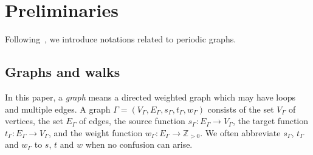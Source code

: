 \documentclass[11pt]{article}
\theoremstyle{definition}
\numberwithin{equation}{section}
\begin{document}
\section{Preliminaries}\label{section:pre}

Following~\cite{IN}, we introduce notations related to periodic graphs.

\subsection{Graphs and walks}

In this paper, a \textit{graph} means a directed weighted graph which may have loops and multiple edges. 
A graph $\Gamma = (V_{\Gamma}, E_{\Gamma}, s_{\Gamma}, t_{\Gamma}, w_{\Gamma})$ 
consists of the set $V_{\Gamma}$ of vertices, the set $E_{\Gamma}$ of edges, 
the source function $s_{\Gamma}: E_{\Gamma} \to V_{\Gamma}$, 
the target function $t_{\Gamma}: E_{\Gamma} \to V_{\Gamma}$, and 
the weight function $w_{\Gamma}: E_{\Gamma} \to \mathbb{Z}_{> 0}$. 
We often abbreviate $s_{\Gamma}$, $t_{\Gamma}$ and $w_{\Gamma}$ to $s$, $t$ and $w$ 
when no confusion can arise. 
\end{document}
